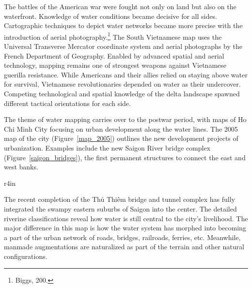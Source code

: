 The battles of the American war were fought not only on land but also on the waterfront. Knowledge of water conditions became decisive for all sides. Cartographic techniques to depict water networks became more precise with the introduction of aerial photography.\footnote{Biggs, 200.} The South Vietnamese map uses the Universal Transverse Mercator coordinate system and aerial photographs by the French Department of Geography. Enabled by advanced spatial and aerial technology, mapping remains one of strongest weapons against Vietnamese guerilla resistance. While Americans and their allies relied on staying above water for survival, Vietnamese revolutionaries depended on water as their undercover. Competing technological and spatial knowledge of the delta landscape spawned different tactical orientations for each side.

The theme of water mapping carries over to the postwar period, with maps of Ho Chi Minh City focusing on urban development along the water lines. The 2005 map of the city (Figure~\ref{map_2005}) outlines the new development projects of urbanization. Examples include the new Saigon River bridge complex (Figure~\ref{saigon_bridges}), the first permanent structures to connect the east and west banks.
\en
\begin{wrapfigure}{r}{4in}
\caption[Saigon River bridge complex]{Saigon River bridge complex (circled red)}
\label{saigon_bridges}
\end{wrapfigure}
The recent completion of the \vi Thủ Thiêm bridge and tunnel complex has fully integrated the swampy eastern suburbs of Saigon into the center. The detailed riverine classifications reveal how water is still central to the city’s livelihood. The major difference in this map is how the water system has morphed into becoming a part of the urban network of roads, bridges, railroads, ferries, etc. Meanwhile, manmade augmentations are naturalized as part of the terrain and other natural configurations.

